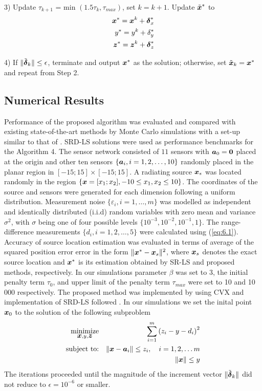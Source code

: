 {{%

3) Update  $\tau_{k+1} $ = min $(1.5\tau_k, \tau_{max})$, set $k = k+1$. Update $\tilde{\mbox{\boldmath$x$}}^{*}$ to
\setcounter{abc}{0}
\begin{eqnarray} 
\nonumber
\mbox{\boldmath$x$}^{*} = \mbox{\boldmath$x$}^k + \mbox{\boldmath${\delta}$}_x^* \\
\nonumber
y^{*} = y^k + \delta_y^* \\
\nonumber
\mbox{\boldmath$z$}^{*} = \mbox{\boldmath$z$}^k + \mbox{\boldmath${\delta}$}_z^*
\end{eqnarray}


4) If $\|\tilde{\mbox{\boldmath${\delta}$}}_k\| \leq \epsilon$, terminate and output $\mbox{\boldmath$x$}^*$ as the solution; otherwise, set $\tilde{\mbox{\boldmath$x$}}_{k} = \mbox{\boldmath$x$}^{*}$  and repeat from Step 2. 

\phantom{m}
}
}

\subsection{Numerical Results}

Performance of the proposed algorithm was evaluated and compared with existing state-of-the-art methods by Monte Carlo simulations with a set-up similar to that of \cite{BeckStLi}. SRD-LS solutions were used as performance benchmarks for the Algorithm 4. The sensor network consisted of $11$ sensors with $\mbox{\boldmath$a$}_0 = \mbox{\boldmath{$0$}}$ placed at the origin and other ten sensors  $\{\mbox{\boldmath$a$}_i, i = 1, 2,\ldots,10\}$ randomly placed in the planar region in $[-15;15]\times[-15;15]$. A radiating source $\mbox{\boldmath$x$}_s$ was located randomly in the region $\{\mbox{\boldmath$x$}=[x_1;x_2], -10\leq x_1,x_2\leq 10\}$. The coordinates of the source and sensors were generated for each dimension following a uniform distribution. Measurement noise $\{\varepsilon_i, i=1,\ldots,m\}$ was modelled as independent and identically distributed (i.i.d) random variables with zero mean and variance $\sigma^2$, with $\sigma$ being one of four possible levels $\{10^{-3}, 10^{-2}, 10^{-1}, 1\}$.  The range-difference measurements $\{d_i, i=1, 2,\ldots,5\}$ were calculated using (\ref{eq:6.1}). Accuracy of source location estimation was evaluated in terms of average of the squared position error error in the form $\|\mbox{\boldmath$x$}^*-\mbox{\boldmath$x$}_s\|^2$, where $\mbox{\boldmath$x$}_s$ denotes the exact source location and $\mbox{\boldmath$x$}^*$ is its estimation obtained by SR-LS and proposed methods, respectively.  
In our simulations parameter $\beta$ was set to 3, the initial penalty term $\tau_0$, and upper limit of the penalty term $\tau_{max}$ were set to 10 and 10 000 respectively. The proposed method was implemented by using  CVX  \cite{cvx} and implementation of SRD-LS followed \cite{BeckStLi}. In our simulations we set the inital point $\mbox{\boldmath$x$}_0$ to the solution of the following subproblem
\setcounter{abc}{0}
\begin{eqnarray} \label{eq:initpnt}
\nonumber
\mathop{\mbox{minimize}}_{\mbox{\boldmath$x$}, y, \mbox{\boldmath$z$}} & &\sum^m_{i=1}\left( z_i - y - d_i\right)^2\\
\nonumber
\mbox{subject to:}& &\|\mbox{\boldmath$x$} - \mbox{\boldmath$a$}_i\| \leq z_i, \quad  i = 1, 2, \ldots m \\
\nonumber
& &\|\mbox{\boldmath$x$}\|  \leq y
\end{eqnarray}
\noindent
The iterations proceeded until the magnitude of the increment vector $\|\tilde{\mbox{\boldmath${\delta}$}}_k\|$ did not reduce to $\epsilon = 10^{-6}$ or smaller. 

